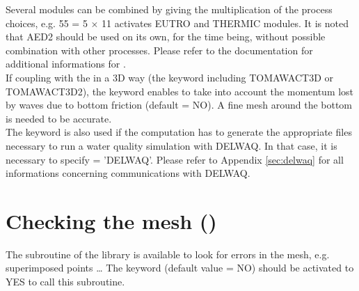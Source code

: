 Several modules can be combined by giving the multiplication of the process
choices, e.g. 55 = 5 $\times$ 11 activates EUTRO and THERMIC modules.
It is noted that AED2 should be used on its own, for the time being,
without possible combination with other processes.
Please refer to the \waqtel documentation for additional informations for
\waqtel.\\

If coupling with the \tomawac in a 3D way (the keyword 
including TOMAWACT3D or TOMAWACT3D2), the keyword
enables to take into account the momentum lost by waves due to
bottom friction (default = NO).
A fine mesh around the bottom is needed to be accurate.\\

The keyword  is also used if the computation
has to generate the appropriate files necessary to run a water quality
simulation with DELWAQ.
In that case, it is necessary to specify  = 'DELWAQ'.
Please refer to Appendix \ref{sec:delwaq} for all informations concerning
communications with DELWAQ.

\section{Checking the mesh ()}

The  subroutine of the \bief library is available to look for
errors in the mesh, e.g. superimposed points \ldots
The keyword  (default value = NO) should be activated
to YES to call this subroutine.
